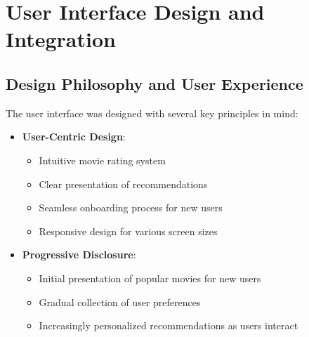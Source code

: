 \documentclass[12pt]{article}
\begin{document}
\section{User Interface Design and Integration}

\subsection{Design Philosophy and User Experience}
The user interface was designed with several key principles in mind:
\begin{itemize}
    \item \textbf{User-Centric Design}:
    \begin{itemize}
        \item Intuitive movie rating system
        \item Clear presentation of recommendations
        \item Seamless onboarding process for new users
        \item Responsive design for various screen sizes
    \end{itemize}
    
    \item \textbf{Progressive Disclosure}:
    \begin{itemize}
        \item Initial presentation of popular movies for new users
        \item Gradual collection of user preferences
        \item Increasingly personalized recommendations as users interact
    \end{itemize}
\end{itemize}
\end{document}

